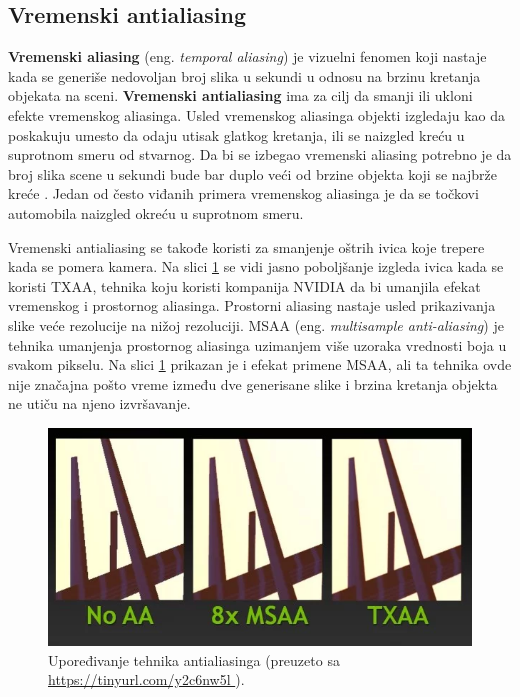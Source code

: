 \documentclass[12pt,oneside]{memoir}
\begin{document}
\subsection{Vremenski antialiasing}

\textbf{Vremenski aliasing} (eng. {\em temporal aliasing}) je vizuelni fenomen koji 
nastaje kada se generiše nedovoljan broj slika u sekundi u odnosu na brzinu kretanja objekata na sceni.
\textbf{Vremenski antialiasing} ima za cilj da smanji ili ukloni efekte vremenskog aliasinga.
Usled vremenskog aliasinga objekti izgledaju kao da poskakuju umesto da odaju utisak glatkog kretanja,
ili se naizgled kreću u suprotnom smeru od stvarnog.
Da bi se izbegao vremenski aliasing potrebno je da broj slika scene u sekundi bude bar duplo veći 
od brzine objekta koji se najbrže kreće \cite{Grant}. 
Jedan od često viđanih primera vremenskog aliasinga je da se točkovi automobila naizgled okreću u suprotnom smeru.

Vremenski antialiasing se takođe koristi za smanjenje oštrih ivica koje trepere kada se pomera kamera.
Na slici \ref{fig:txaa} se vidi jasno poboljšanje izgleda ivica kada se koristi TXAA,
tehnika koju koristi kompanija NVIDIA da bi umanjila efekat vremenskog i prostornog aliasinga.
Prostorni aliasing nastaje usled prikazivanja slike veće rezolucije na nižoj rezoluciji.
MSAA (eng. {\em multisample anti-aliasing}) je tehnika umanjenja prostornog aliasinga 
uzimanjem više uzoraka vrednosti boja u svakom pikselu.
Na slici \ref{fig:txaa} prikazan je i efekat primene MSAA, ali ta tehnika ovde nije značajna 
pošto vreme između dve generisane slike i brzina kretanja objekta ne utiču na njeno izvršavanje.

\begin{figure}[h!]
	\centering
	\includegraphics[scale=0.65]{txaa.png}
	\caption{Upoređivanje tehnika antialiasinga (preuzeto sa \url{ https://tinyurl.com/y2c6nw5l }).}
	
	\label{fig:txaa}
\end{figure}
\end{document}
